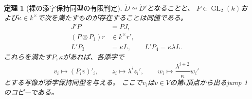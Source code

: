 \documentclass[11pt,a4paper]{ltjsarticle}
\newtheorem{theorem}{定理}[section]
\theoremstyle{definition}
\newcommand{\GL}{\operatorname{GL}}
\begin{document}
\begin{theorem}[裸の添字保持同型の有限判定]
\label{idx:thm:finite-isomorphism}
$\check D\simeq\check D'$となることと、
$P\in\GL_2(k)$および$\kappa\in k^\times$で次を満たすものが存在することは同値である。
\begin{align}
J'P&=PJ,\label{idx:eq:isomorphism-J}\\
(P\otimes P_1)r&\in k^\times r',\label{idx:eq:isomorphism-r}\\
L'P_3&=\kappa L,\qquad
L'P_4=\kappa\lambda L.\label{idx:eq:isomorphism-L}
\end{align}
これらを満たす$P,\kappa$があれば、各添字で
\begin{equation}\label{idx:eq:isomorphism-explicit}
v_i\longmapsto (P_iv)'_i,\qquad
z_i\longmapsto\lambda^i z_i',\qquad
w_i\longmapsto\frac{\lambda^{i+2}}{\kappa}w_i'
\end{equation}
とする写像が添字保持同型を与える。
ここで$v_i$は$v\in V$の第$i$頂点から出るjump 1のコピーである。
\end{theorem}
\end{document}
